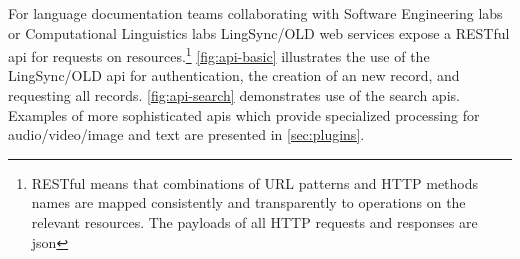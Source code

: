 \documentclass[11pt]{article}
\begin{document}
%
%
%
%
%
%
%
%
For language documentation teams collaborating with Software Engineering labs or Computational Linguistics labs LingSync/OLD web services expose a RESTful \gls{api} for requests on resources.\footnote{RESTful means that 
combinations of URL patterns and HTTP methods names are mapped consistently and
transparently to operations on the relevant resources. The payloads of all HTTP
requests and responses are \gls{json}}
 \autoref{fig:api-basic}
illustrates the use of the LingSync/OLD \gls{api} for authentication, the creation of an new record, and requesting all records. \autoref{fig:api-search} demonstrates use of the search \gls{api}s. Examples of more sophisticated  \gls{api}s which provide specialized processing for audio/video/image and text  are presented in \autoref{sec:plugins}.
\end{document}
